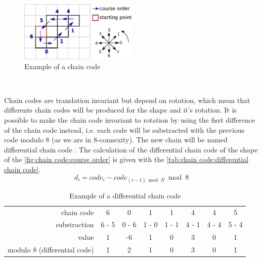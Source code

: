 \begin{figure}[H]
	\centering
	\includegraphics[width=0.5\textwidth]{images/chain_code/example}
	\caption{Example of a chain code}
	\label{fig:chain code:example}	
\end{figure}

~~

Chain codes are translation invariant but depend on rotation, which mean that differents chain codes will be produced for the shape and it's rotation. It is possible to make the chain code invariant to rotation by using the fisrt difference of the chain code instead, i.e. each code will be substracted with the previous code modulo 8 (as we are in 8-connexity). The new chain will be named differential chain code \cite{bib:chain:RepresentationAndDescription}. The calculation of the differential chain code of the shape of the \vref{fig:chain code:course order} is given with the \vref{tab:chain code:differential chain code}.
\begin{equation} \label{eq:chain code:differential chain code}
d_i = code_i - code_{(i-1) \bmod N} \bmod 8
\end{equation}

\begin{table}[ht]
	\centering
	\caption{Example of a differential chain code}
	\label{tab:chain code:differential chain code}
	\begin{tabular}{rccccccc}
\toprule 
chain code   & 6     & 0     & 1     & 1     & 4     & 4     & 5     \\
substraction & 6 - 5 & 0 - 6 & 1 - 0 & 1 - 1 & 4 - 1 & 4 - 4 & 5 - 4 \\
value     	 & 1     & -6    & 1     & 0     & 3     & 0     & 1     \\
modulo 8 (differential code)  	 & 1     & 2     & 1     & 0     & 3     & 0     & 1     \\ 
\bottomrule 
	\end{tabular}
\end{table}


